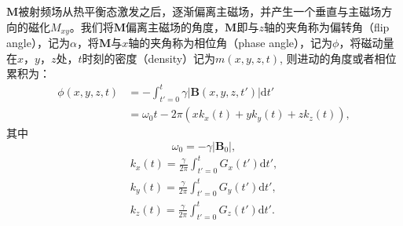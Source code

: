  $\mathrm{\textbf{M}}$被射频场从热平衡态激发之后，逐渐偏离主磁场，并产生一个垂直与主磁场方向的磁化$M_{xy}$。我们将$\mathrm{\textbf{M}}$偏离主磁场的角度，$\mathrm{\textbf{M}}$即与$z$轴的夹角称为偏转角（flip angle），记为$\alpha$，将$\mathrm{\textbf{M}}$与$x$轴的夹角称为相位角（phase angle），记为$\phi$，将磁动量在$x$，$y$，$z$处，$t$时刻的密度（density）记为$m(x,y,z,t)$, 则进动的角度或者相位累积为：
 \begin{equation}
 \begin{aligned}
 	 \phi(x,y,z,t)&=-\int_{t'=0}^t \gamma|\mathrm{\textbf{B}}(x,y,z,t')|\mathrm{d}t'\\
 	&=\omega_0t-2\pi(xk_x(t)+yk_y(t)+zk_z(t)),
 \end{aligned}
 \end{equation}
其中
\begin{equation}
	\omega_0=-\gamma|\mathrm{\textbf{B}}_0|,
\end{equation}
\begin{equation}
\begin{aligned}
	k_x(t)=\frac{\gamma}{2\pi}\int_{t'=0}^t G_x(t')\mathrm{d}t',\\
	k_y(t)=\frac{\gamma}{2\pi}\int_{t'=0}^t G_y(t')\mathrm{d}t',\\
	k_z(t)=\frac{\gamma}{2\pi}\int_{t'=0}^t G_z(t')\mathrm{d}t'.
\end{aligned}
\end{equation}

